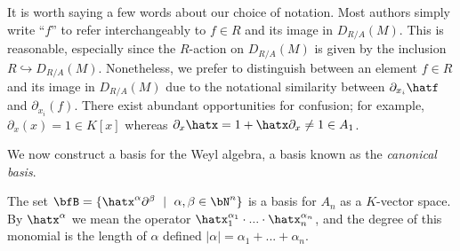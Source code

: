\begin{rmk}
	It is worth saying a few words about our choice of notation. Most authors simply write ``$f$'' to refer interchangeably to $f \in R$ and its image in $D_{R/A}(M)$. This is reasonable, especially since the $R$-action on $D_{R/A}(M)$ is given by the inclusion $R\hookrightarrow D_{R/A}(M)$. Nonetheless, we prefer to distinguish between an element $f\in R$ and its image in $D_{R/A}(M)$ due to the notational similarity between $\partial_{x_i}\hatf$ and $\partial_{x_i}(f)$. There exist abundant opportunities for confusion; for example, $\partial_x(x) = 1 \in K[x]$ whereas $\partial_x\hatx = 1 + \hatx\partial_x \neq 1 \in A_1$.
\end{rmk}

We now construct a basis for the Weyl algebra, a basis known as the \emph{canonical basis}.
\begin{lem}\label{lem:canonical-basis}
	The set $\bfB = \{\hatx^\alpha\partial^\beta ~\mid~ \alpha,\beta \in \bN^n\}$ is a basis for $A_n$ as a $K$-vector space. By $\hatx^\alpha$ we mean the operator $\hatx^{\alpha_1}_1\cdot...\cdot \hatx^{\alpha_n}_n$, and the degree of this monomial is the length of $\alpha$ defined $|\alpha| = \alpha_1 + ... + \alpha_n$.
\end{lem}
